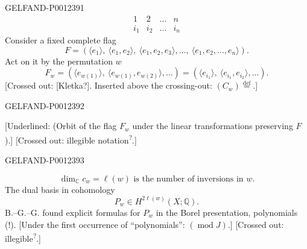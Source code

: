 \begin{GelfandAdjacentEvidence}{GELFAND-P001239}{1}
\begin{equation*}
\begin{array}{cccc}
1&2&\ldots&n\\
i_1&i_2&\ldots&i_n
\end{array}
\end{equation*}
Consider a fixed complete flag
\begin{equation*}
F=(\langle e_1\rangle,\ \langle e_1,e_2\rangle,\ \langle e_1,e_2,e_3\rangle,\ldots,\ \langle e_1,e_2,\ldots,e_n\rangle).
\end{equation*}
Act on it by the permutation $w$
\begin{equation*}
F_w=(\langle e_{w(1)}\rangle,\ \langle e_{w(1)},e_{w(2)}\rangle,\ldots)
=(\langle e_{i_1}\rangle,\ \langle e_{i_1},e_{i_2}\rangle,\ldots).
\end{equation*}
[Crossed out: [Kletka?]. Inserted above the crossing-out: $(C_w)\overset{\mathrm{def}}{=}$.]
\end{GelfandAdjacentEvidence}
\begin{GelfandAdjacentEvidence}{GELFAND-P001239}{2}

[Underlined: (Orbit of the flag $F_w$ under the linear transformations preserving $F$).]
[Crossed out: illegible notation\textsuperscript{?}.]
\end{GelfandAdjacentEvidence}
\begin{GelfandAdjacentEvidence}{GELFAND-P001239}{3}

\begin{equation*}
\dim_{\mathbb C} c_w=\ell(w)\text{ is the number of inversions in }w.
\end{equation*}
The dual basis in cohomology
\begin{equation*}
P_w\in H^{2\ell(w)}(X;\mathbb Q).
\end{equation*}
B.–G.–G. found explicit formulas for $P_w$ in the Borel presentation, polynomials (!).
[Under the first occurrence of “polynomials”: $(\operatorname{mod}J)$.]
[Crossed out: illegible\textsuperscript{?}.]
\end{GelfandAdjacentEvidence}
